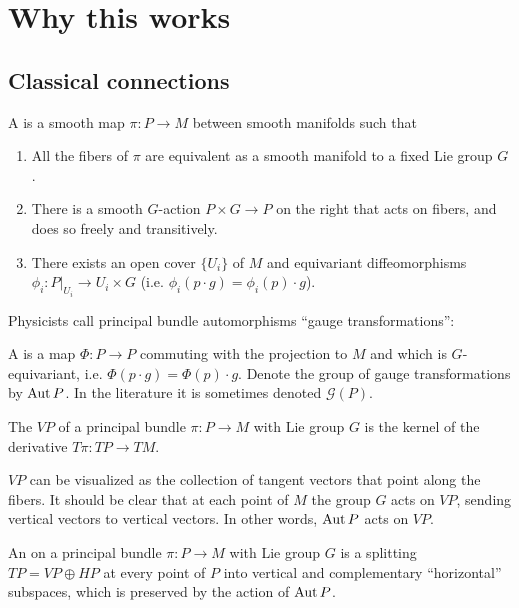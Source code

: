 \section{Why this works}

\subsection{Classical connections}

\begin{mydef}
A  is a smooth map \( \pi:P\to M \) between smooth manifolds such that
\begin{enumerate}
\item All the fibers of \( \pi \) are equivalent as a smooth manifold to a fixed Lie group \( G \).
\item There is a smooth \( G \)-action \( P\times G\to P \) on the right that acts on fibers, and does so freely and transitively.
\item There exists an open cover \( \{U_i\} \) of \( M \) and equivariant diffeomorphisms \( \phi_i:P|_{U_i}\to U_i\times G \) (i.e. \( \phi_i(p\cdot g)= \phi_i(p)\cdot g\)).
\end{enumerate}
\end{mydef}

Physicists call principal bundle automorphisms ``gauge transformations'':

\begin{mydef}
A  is a map \( \Phi:P\to P \) commuting with the projection to \( M \) and which is \( G \)-equivariant, i.e. \( \Phi(p\cdot g) = \Phi(p)\cdot g \). Denote the group of gauge transformations by \( \operatorname{Aut} P \). In the literature it is sometimes denoted \( \mathscr{G}(P) \).
\end{mydef}

\begin{mydef}
The  \( VP \) of a principal bundle \( \pi:P\to M \) with Lie group \( G \) is the kernel of the derivative \( T\pi:TP\to TM \).
\end{mydef}

\( VP \) can be visualized as the collection of tangent vectors that point along the fibers. It should be clear that at each point of \( M \) the group \( G \) acts on \( VP \), sending vertical vectors to vertical vectors. In other words, \( \operatorname{Aut} P \) acts on \( VP \).

\begin{mydef}
An  on a principal bundle \( \pi:P\to M \) with Lie group \( G \) is a splitting \( TP=VP\oplus HP \) at every point of \( P \) into vertical and complementary ``horizontal'' subspaces, which is preserved by the action of \( \operatorname{Aut} P \).
\end{mydef}

